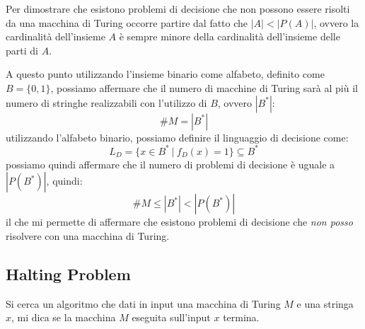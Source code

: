 Per dimostrare che esistono problemi di decisione che non possono essere risolti 
da una macchina di Turing occorre partire dal fatto che $|A| < |P(A)|$, ovvero la
 cardinalità dell'insieme $A$ è sempre minore della cardinalità dell'insieme delle 
 parti di $A$. 

A questo punto utilizzando l'insieme binario come alfabeto, definito come $B = \{0, 1\}$, 
possiamo affermare che il numero di macchine di Turing sarà al più il numero di 
stringhe realizzabili con l'utilizzo di $B$, ovvero $|B^{\ast}|$:
\begin{equation}
    \# M = |B^{\ast}|
\end{equation}
utilizzando l'alfabeto binario, possiamo definire il linguaggio di decisione come:
\begin{equation}
    L_D = \{x \in B^{\ast} \ | \ f_D(x) = 1\} \subseteq B^{\ast}
\end{equation}
possiamo quindi affermare che il numero di problemi di decisione è uguale a 
$|P(B^{\ast})|$, quindi:
\begin{equation}
    \# M \leq |B^{\ast}| < |P(B^{\ast})|
\end{equation}
il che mi permette di affermare che esistono problemi di decisione che 
\textit{non posso} risolvere con una macchina di Turing.
\subsection{Halting Problem}
Si cerca un algoritmo che dati in input una macchina di Turing $M$ e una stringa 
$x$, mi dica se la macchina $M$ eseguita sull'input $x$ termina.

